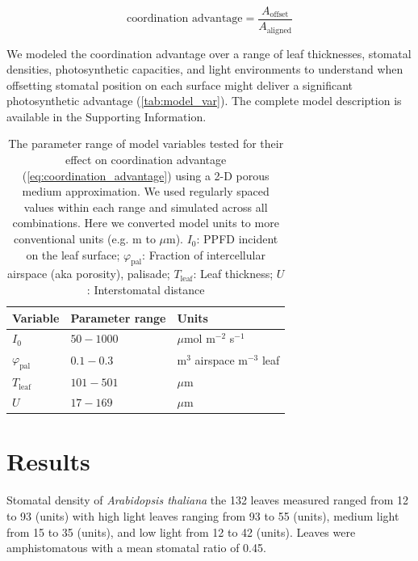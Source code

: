\documentclass[12pt,halfline,a4paper,]{ouparticle}
\begin{document}
\begin{equation} \label{eq:coordination_advantage}
  \text{coordination advantage} = \frac{A_\text{offset}}{A_\text{aligned}}
\end{equation}

We modeled the coordination advantage over a range of leaf thicknesses,
stomatal densities, photosynthetic capacities, and light environments to
understand when offsetting stomatal position on each surface might
deliver a significant photosynthetic advantage
(\autoref{tab:model_var}). The complete model description is available
in the Supporting Information.

\begin{table}

\caption{\label{tab:model_var}The parameter range of model variables tested for their effect on coordination advantage (\autoref{eq:coordination_advantage}) using a 2-D porous medium approximation. We used regularly spaced values within each range and simulated across all combinations. Here we converted model units to more conventional units (e.g. m to $\mu$m). $I_0$: PPFD incident on the leaf surface; $\varphi_\text{pal}$: Fraction of intercellular airspace (aka porosity), palisade; $T_\text{leaf}$: Leaf thickness; $U$: Interstomatal distance}
\centering
\begin{tabular}[t]{lll}
\toprule
Variable & Parameter range & Units\\
\midrule
$I_0$ & $50-1000$ & $\mu$mol m$^{-2}$ s$^{-1}$\\
$\varphi_\text{pal}$ & $0.1-0.3$ & m$^3$ airspace m$^{-3}$ leaf\\
$T_\text{leaf}$ & $101-501$ & $\mu$m\\
$U$ & $17-169$ & $\mu$m\\
\bottomrule
\end{tabular}
\end{table}

\hypertarget{results}{%
\section{Results}\label{results}}

Stomatal density of \emph{Arabidopsis thaliana} the 132 leaves measured
ranged from 12 to 93 (units) with high light leaves ranging from 93 to
55 (units), medium light from 15 to 35 (units), and low light from 12 to
42 (units). Leaves were amphistomatous with a mean stomatal ratio of
0.45.
\end{document}
